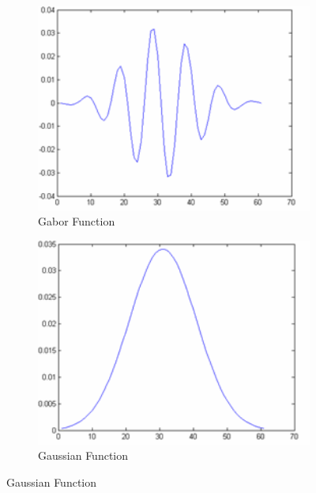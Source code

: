 \begin{figure}[h]
        \centering
        \begin{subfigure}[b]{0.3\textwidth}
                \centering
                \includegraphics[width=1.0\textwidth]{figures/LitreatureReview/GaborFunction.png}
                \caption{Gabor Function}
                \label{fig:gabor}
        \end{subfigure}
        \begin{subfigure}[b]{0.3\textwidth}
                \centering
                \includegraphics[width=1.0\textwidth]{figures/LitreatureReview/GaussianFunction.png}
                \caption{Gaussian Function}
                \label{fig:gaus}
        \end{subfigure}

\end{figure}
